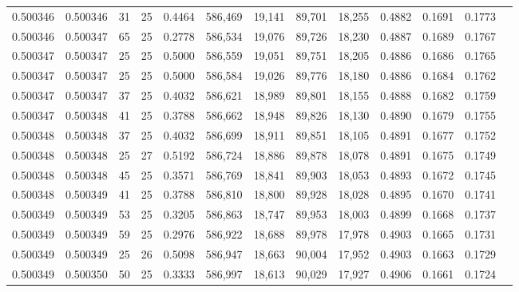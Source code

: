 \begin{tabular}{rrrrrrrrrrrrr}
0.500346 & 0.500346 &    31 &  25 &                                     0.4464 & 586,469 &  19,141 &  89,701 &  18,255 & 0.4882 & 0.1691 & 0.1773 \\
0.500346 & 0.500347 &    65 &  25 &                                     0.2778 & 586,534 &  19,076 &  89,726 &  18,230 & 0.4887 & 0.1689 & 0.1767 \\
0.500347 & 0.500347 &    25 &  25 &                                     0.5000 & 586,559 &  19,051 &  89,751 &  18,205 & 0.4886 & 0.1686 & 0.1765 \\
0.500347 & 0.500347 &    25 &  25 &                                     0.5000 & 586,584 &  19,026 &  89,776 &  18,180 & 0.4886 & 0.1684 & 0.1762 \\
0.500347 & 0.500347 &    37 &  25 &                                     0.4032 & 586,621 &  18,989 &  89,801 &  18,155 & 0.4888 & 0.1682 & 0.1759 \\
0.500347 & 0.500348 &    41 &  25 &                                     0.3788 & 586,662 &  18,948 &  89,826 &  18,130 & 0.4890 & 0.1679 & 0.1755 \\
0.500348 & 0.500348 &    37 &  25 &                                     0.4032 & 586,699 &  18,911 &  89,851 &  18,105 & 0.4891 & 0.1677 & 0.1752 \\
0.500348 & 0.500348 &    25 &  27 &                                     0.5192 & 586,724 &  18,886 &  89,878 &  18,078 & 0.4891 & 0.1675 & 0.1749 \\
0.500348 & 0.500348 &    45 &  25 &                                     0.3571 & 586,769 &  18,841 &  89,903 &  18,053 & 0.4893 & 0.1672 & 0.1745 \\
0.500348 & 0.500349 &    41 &  25 &                                     0.3788 & 586,810 &  18,800 &  89,928 &  18,028 & 0.4895 & 0.1670 & 0.1741 \\
0.500349 & 0.500349 &    53 &  25 &                                     0.3205 & 586,863 &  18,747 &  89,953 &  18,003 & 0.4899 & 0.1668 & 0.1737 \\
0.500349 & 0.500349 &    59 &  25 &                                     0.2976 & 586,922 &  18,688 &  89,978 &  17,978 & 0.4903 & 0.1665 & 0.1731 \\
0.500349 & 0.500349 &    25 &  26 &                                     0.5098 & 586,947 &  18,663 &  90,004 &  17,952 & 0.4903 & 0.1663 & 0.1729 \\
0.500349 & 0.500350 &    50 &  25 &                                     0.3333 & 586,997 &  18,613 &  90,029 &  17,927 & 0.4906 & 0.1661 & 0.1724 \\

\end{tabular}
